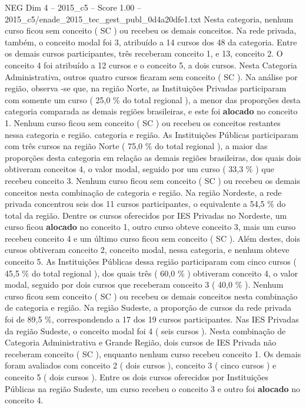 \begin{textsample}{NEG Dim 4 – 2015\_c5 – Score 1.00 – 2015\_c5/enade\_2015\_tec\_gest\_publ\_0d4a20dfe1.txt}
Nesta categoria, nenhum curso ficou sem conceito ( SC ) ou recebeu os demais conceitos.
Na rede privada, também, o conceito modal foi 3, atribuído a 14 cursos dos 48 da categoria.
Entre os demais cursos participantes, três receberam conceito 1, e 13, conceito 2.
O conceito 4 foi atribuído a 12 cursos e o conceito 5, a dois cursos.
Nesta Categoria Administrativa, outros quatro cursos ficaram sem conceito ( SC ).
Na análise por região, observa -se que, na região Norte, as Instituições Privadas participaram com somente um curso ( 25,0 \% do total regional ), a menor das proporções desta categoria comparada as demais regiões brasileiras, e este foi \textbf{alocado} no conceito 1.
Nenhum curso ficou sem conceito ( SC ) ou recebeu os conceitos restantes nessa categoria e região. categoria e região.
As Instituições Públicas participaram com três cursos na região Norte ( 75,0 \% do total regional ), a maior das proporções desta categoria em relação as demais regiões brasileiras, dos quais dois obtiveram conceitos 4, o valor modal, seguido por um curso ( 33,3 \% ) que recebeu conceito 3.
Nenhum curso ficou sem conceito ( SC ) ou recebeu os demais conceitos nesta combinação de categoria e região.
Na região Nordeste, a rede privada concentrou seis dos 11 cursos participantes, o equivalente a 54,5 \% do total da região.
Dentre os cursos oferecidos por IES Privadas no Nordeste, um curso ficou \textbf{alocado} no conceito 1, outro curso obteve conceito 3, mais um curso recebeu conceito 4 e um último curso ficou sem conceito ( SC ).
Além destes, dois cursos obtiveram conceito 2, conceito modal, nessa categoria, e nenhum obteve conceito 5.
As Instituições Públicas dessa região participaram com cinco cursos ( 45,5 \% do total regional ), dos quais três ( 60,0 \% ) obtiveram conceito 4, o valor modal, seguido por dois cursos que receberam conceito 3 ( 40,0 \% ).
Nenhum curso ficou sem conceito ( SC ) ou recebeu os demais conceitos nesta combinação de categoria e região.
Na região Sudeste, a proporção de cursos da rede privada foi de 89,5 \%, correspondendo a 17 dos 19 cursos participantes.
Nas IES Privadas da região Sudeste, o conceito modal foi 4 ( seis cursos ).
Nesta combinação de Categoria Administrativa e Grande Região, dois cursos de IES Privada não receberam conceito ( SC ), enquanto nenhum curso recebeu conceito 1.
Os demais foram avaliados com conceito 2 ( dois cursos ), conceito 3 ( cinco cursos ) e conceito 5 ( dois cursos ).
Entre os dois cursos oferecidos por Instituições Públicas na região Sudeste, um curso recebeu o conceito 3 e outro foi \textbf{alocado} no conceito 4.

\end{textsample}
